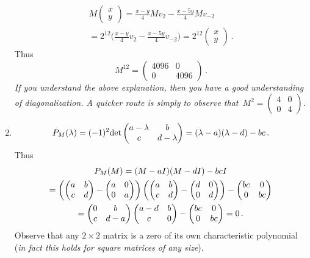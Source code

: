 \begin{enumerate}
\begin{gather*}
M \begin{pmatrix} x \\ y \end{pmatrix} = \frac{x-y}{4} M v_2  -\frac{x-5y}4 M v_{-2}\\ = 2^{12} \Big(\frac{x-y}{4}  v_2 -\frac{x-5y}4  v_{-2}\Big) 
= 2^{12} \begin{pmatrix} x \\ y \end{pmatrix}\, .
\end{gather*}
Thus \[M^{12}=\begin{pmatrix} 4096 & 0 \\ 0 & 4096\end{pmatrix}\, .\]
{\it If you understand the above explanation, then you have a good understanding of diagonalization.  A quicker route  
is simply to observe that~$M^2 = \begin{pmatrix}4 & 0 \\ 0 & 4\end{pmatrix} $.}

\item 
\[
P_M(\lambda) = (-1)^2 {\rm det}\begin{pmatrix} a-\lambda & \mc b  \\ \mc c &d-\lambda\end{pmatrix}
=(\lambda-a)(\lambda-d) - bc\, . 
\]
Thus
\begin{gather*}
P_M(M)=(M-a I )(M- d I) - bc I \\= 
\left(\begin{pmatrix}a&b\\c&d\end{pmatrix}-\begin{pmatrix}a&0\\0&a\end{pmatrix}\right)
\left(\begin{pmatrix}a&b\\c&d\end{pmatrix}-\begin{pmatrix}d&0\\0&d\end{pmatrix}\right)-\begin{pmatrix}bc&0\\0&bc\end{pmatrix}
\\
=\begin{pmatrix}0&\mc b\\c&d-a\end{pmatrix}\begin{pmatrix}a-d&b\\\mc c&0\end{pmatrix}-\begin{pmatrix}bc&0\\0&bc\end{pmatrix}=0\, .
\end{gather*}
Observe that any $2\times 2$ matrix is a zero of its own characteristic polynomial ({\it in fact this holds for square matrices of any size}).


\end{enumerate}
